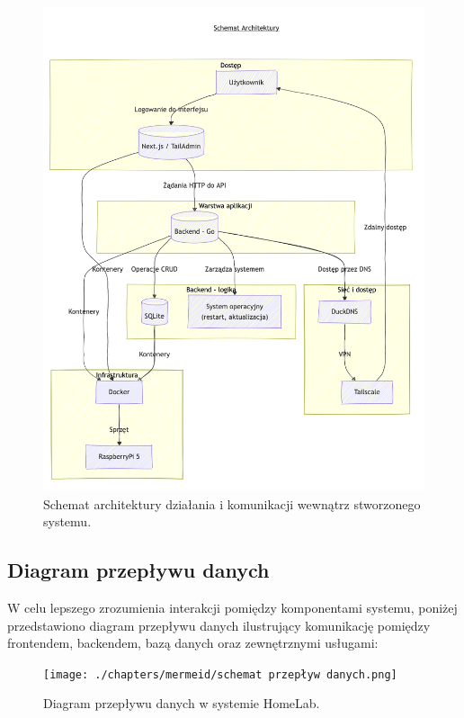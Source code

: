 \begin{figure}[H]
    \centering
    \includegraphics[width=1\textwidth]{./chapters/mermeid/schemat_architektury_updated.png}
    \caption{Schemat architektury działania i komunikacji wewnątrz stworzonego systemu.}
    \label{fig:architecture_app}
  \end{figure}

\subsection{Diagram przepływu danych}
W celu lepszego zrozumienia interakcji pomiędzy komponentami systemu, poniżej przedstawiono diagram przepływu danych ilustrujący komunikację pomiędzy frontendem, backendem, bazą danych oraz zewnętrznymi usługami:
\begin{figure}[H]
    \centering
    \texttt{[image: ./chapters/mermeid/schemat przepływ danych.png]}
    \caption{Diagram przepływu danych w systemie HomeLab.}
    \label{fig:data_flow}
\end{figure}

